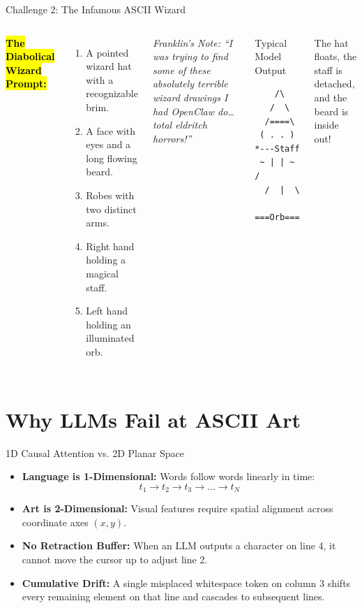 \documentclass[aspectratio=169,11pt,xcolor={table,dvipsnames}]{beamer}
\begin{document}
\begin{frame}[fragile]{Challenge 2: The Infamous ASCII Wizard}
  \begin{columns}[T]
      \textbf{\hl{The Diabolical Wizard Prompt:}}
      \begin{enumerate}
        \item A pointed wizard hat with a recognizable brim.
        \item A face with eyes and a long flowing beard.
        \item Robes with two distinct arms.
        \item Right hand holding a magical staff.
        \item Left hand holding an illuminated orb.
      \end{enumerate}

      \vspace{0.25cm}
      \footnotesize\textcolor{accentamber}{\textit{Franklin's Note: ``I was trying to find some of these absolutely terrible wizard drawings I had OpenClaw do\dots{} total eldritch horrors!''}}%

      \begin{exampleblock}{Typical Model Output}
\begin{lstlisting}
    /\
   /  \
  /====\
 ( . . )  *---Staff
 ~ | | ~ /
  /  |  \
  ===Orb===
\end{lstlisting}
      \end{exampleblock}
      \vspace{0.1cm}
      \footnotesize The hat floats, the staff is detached, and the beard is inside out!
  \end{columns}
\end{frame}

\section{Why LLMs Fail at ASCII Art}

\begin{frame}{1D Causal Attention vs. 2D Planar Space}
  \begin{itemize}
    \item \textbf{Language is 1-Dimensional:} Words follow words linearly in time:
      \[
        t_1 \longrightarrow t_2 \longrightarrow t_3 \longrightarrow \dots \longrightarrow t_N
      \]
    \item \textbf{Art is 2-Dimensional:} Visual features require spatial alignment across coordinate axes $(x, y)$.
    \item \textbf{No Retraction Buffer:} When an LLM outputs a character on line 4, it cannot move the cursor up to adjust line 2.
    \item \textbf{Cumulative Drift:} A single misplaced whitespace token on column 3 shifts every remaining element on that line and cascades to subsequent lines.
  \end{itemize}
\end{frame}
\end{document}
